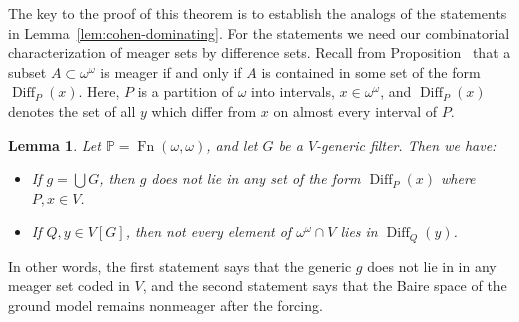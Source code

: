 \documentclass[11pt,oneside]{amsbook}
\newcommand{\PP}{\mathbb P}
\DeclareMathOperator{\Diff}{Diff}
\DeclareMathOperator{\Fn}{Fn}
\theoremstyle{definition}
\theoremstyle{plain}
\newtheorem{lem}[thm]{Lemma}
\theoremstyle{definition}
\theoremstyle{remark}
\numberwithin{equation}{section}
\numberwithin{figure}{section}
\begin{document}
The key to the proof of this theorem is to establish the analogs of the statements in Lemma~\ref{lem:cohen-dominating}. For the statements we need our combinatorial characterization of meager sets by difference sets. Recall from Proposition~\label{prop:meager-diff} that a subset $A\subset\omega^\omega$ is meager if and only if $A$ is contained in some set of the form $\Diff_P(x)$. Here, $P$ is a partition of $\omega$ into intervals, $x\in\omega^\omega$, and $\Diff_P(x)$ denotes the set of all $y$ which differ from $x$ on almost every interval of $P$.

\begin{lem}
  \label{lem:cohen-meager}
  Let $\PP=\Fn(\omega,\omega)$, and let $G$ be a $V$-generic filter. Then we have:
  \begin{itemize}
  \item If $g=\bigcup G$, then $g$ does not lie in any set of the form $\Diff_P(x)$ where $P,x\in V$.
  \item If $Q,y\in V[G]$, then not every element of $\omega^\omega\cap V$ lies in $\Diff_Q(y)$.
  \end{itemize}
\end{lem}

In other words, the first statement says that the generic $g$ does not lie in in any meager set coded in $V$, and the second statement says that the Baire space of the ground model remains nonmeager after the forcing.
\end{document}
